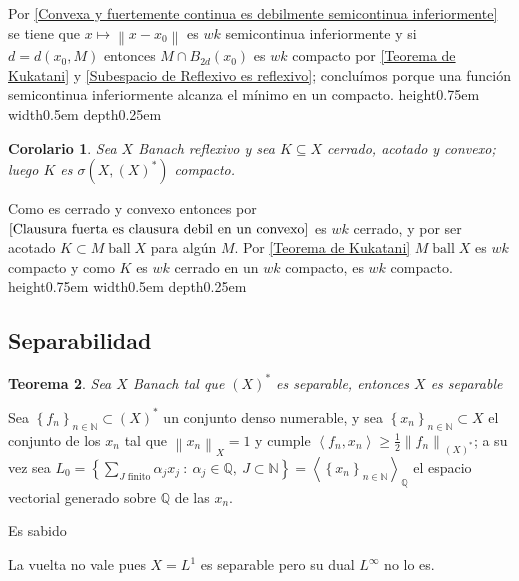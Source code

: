 \documentclass[11pt]{article}
\newcommand{\Q}{\mathbb{Q}}
\newcommand{\N}{{\mathbb{N}}}
\newcommand\tq{~:~}
\newcommand{\dual}[1]{\left(#1\right)^{\ast}}
\newcommand{\norm}[1]{\left\lVert#1\right\rVert}
\newcommand{\ip}[1]{\left\langle#1\right\rangle}
\newcommand{\sett}[1]{\left\lbrace#1\right\rbrace}
\newcommand{\Bigsum}[2]{\sum\limits_{#1}{#2}}
\DeclareMathOperator{\ball}{ball}
\newtheorem{theorem}{Teorema}
\numberwithin{theorem}{subsection}
\newtheorem{corollary}[theorem]{Corolario}
\newenvironment{proof}[1][Demostraci\'on]{\begin{trivlist}
		\item[\hskip \labelsep {\bfseries #1}]}{\end{trivlist}}
\newenvironment{remark}[1][Observaci\'on]{\begin{trivlist}
		\item[\hskip \labelsep {\bfseries #1}]}{\end{trivlist}}
\newcommand{\qed}{\nobreak \ifvmode \relax \else
	\ifdim\lastskip<1.5em \hskip-\lastskip
	\hskip1.5em plus0em minus0.5em \fi \nobreak
	\vrule height0.75em width0.5em depth0.25em\fi}
\begin{document}
\begin{proof}
	Por \ref{Convexa y fuertemente continua es debilmente semicontinua inferiormente} se tiene que $x \mapsto \norm{x-x_0}$ es $wk$ semicontinua inferiormente y si $d = d(x_0,M)$ entonces $M \cap B_{2d}(x_0)$ es $wk$ compacto por \ref{Teorema de Kukatani} y \ref{Subespacio de Reflexivo es reflexivo}; conclu\'imos porque una funci\'on semicontinua inferiormente alcanza el m\'inimo en un compacto.\qed
\end{proof}

\begin{corollary}
	\label{Cerrado, acotado y convexo es debilmente compacto}
	Sea $X$ Banach reflexivo y sea $K \subseteq X$ cerrado, acotado y convexo; luego $K$ es $\sigma \left(X,\dual{X}\right)$ compacto.
\end{corollary}

\begin{proof}
	Como es cerrado y convexo entonces por $\ref{Clausura fuerta es clausura debil en un convexo}$ es $wk$ cerrado, y por ser acotado $K \subset M \ball X$ para alg\'un $M$. Por \ref{Teorema de Kukatani} $M \ball X$ es $wk$ compacto y como $K$ es $wk$ cerrado en un $wk$ compacto, es $wk$ compacto. \qed
\end{proof}

\subsection{Separabilidad}


\begin{theorem}
	\label{Si el dual es separable entonces X lo es}
	Sea $X$ Banach tal que $\dual{X}$ es separable, entonces $X$ es separable
\end{theorem}

\begin{proof}
	Sea $\sett{f_n}_{n \in \N} \subset \dual{X}$ un conjunto denso numerable, y sea $\sett{x_n}_{n \in \N} \subset X$ el conjunto de los $x_n$ tal que $\norm{x_n}_{X} = 1$ y cumple $\ip{f_n,x_n} \geq \frac{1}{2} \norm{f_n}_{\dual{X}}$; a su vez sea $L_0 = \sett{\Bigsum{J \text{ finito}}{\alpha_j x_j} \tq \alpha_j \in \Q, \ J \subset \N} = \ip{\sett{x_n}_{n \in \N}}_{\Q}$ el espacio vectorial generado sobre $\Q$ de las $x_n$.
	
	Es sabido 
	 
\end{proof}

\begin{remark}
	La vuelta no vale pues $X=L^1$ es separable pero su dual $L^{\infty}$ no lo es.
\end{remark}
\end{document}
